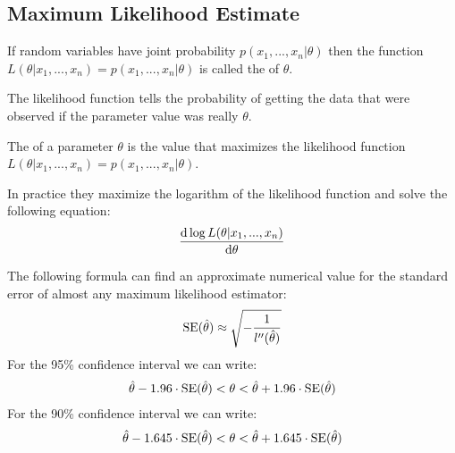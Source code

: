 \subsection{Maximum Likelihood Estimate}

\begin{definition}
    If random variables have joint probability $p(x_1,...,x_n\vert \theta)$ then the function $L(\theta\vert x_1,...,x_n)=p(x_1,...,x_n\vert\theta)$ is called the  of $\theta$.
\end{definition}

The likelihood function tells the probability of getting the data that were observed if the parameter value was really $\theta$.

\begin{definition}
    The  of a parameter $\theta$ is the value that maximizes the likelihood function $L(\theta\vert x_1,...,x_n) = p(x_1,...,x_n\vert\theta)$.
\end{definition}

In practice they maximize the logarithm of the likelihood function and solve the following equation:
\begin{align}
    \frac{\mathrm{d}\log L(\theta\vert x_1,...,x_n)}{\mathrm{d}\theta}\notag
\end{align}

The following formula can find an approximate numerical value for the standard error of almost any maximum likelihood estimator:
\begin{align}
    \operatorname{SE}(\hat{\theta}) \approx\sqrt{-\frac{1}{l''(\hat{\theta})}}\notag
\end{align}
For the 95\% confidence interval we can write:
\begin{align}
    \hat{\theta} - 1.96\cdot\operatorname{SE}(\hat{\theta}) < \theta < \hat{\theta} + 1.96\cdot\operatorname{SE}(\hat{\theta}) \notag
\end{align}
For the 90\% confidence interval we can write:
\begin{align}
    \hat{\theta} - 1.645\cdot\operatorname{SE}(\hat{\theta}) < \theta < \hat{\theta} + 1.645\cdot\operatorname{SE}(\hat{\theta}) \notag
\end{align}

